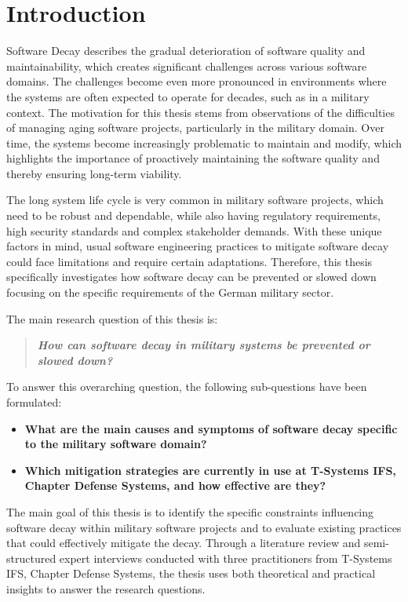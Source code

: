 \section{Introduction}
Software Decay describes the gradual deterioration of software quality and maintainability, which creates significant challenges across various software domains.
The challenges become even more pronounced in environments where the systems are often expected to operate for decades, such as in a military context.
The motivation for this thesis stems from observations of the difficulties of managing aging software projects, particularly in the military domain.
Over time, the systems become increasingly problematic to maintain and modify, which highlights the importance of proactively maintaining the software quality and thereby ensuring long-term viability.

The long system life cycle is very common in military software projects, which need to be robust and dependable, while also having regulatory requirements,
high security standards and complex stakeholder demands. With these unique factors in mind, usual software engineering practices to mitigate software decay 
could face limitations and require certain adaptations. Therefore, this thesis specifically investigates how software decay can be prevented or slowed down
focusing on the specific requirements of the German military sector.

The main research question of this thesis is:
\begin{quote}
    \textit{\textbf{How can software decay in military systems be prevented or slowed down?}}
\end{quote}
To answer this overarching question, the following sub-questions have been formulated:
\begin{itemize}
    \item \textbf{What are the main causes and symptoms of software decay specific to the military software domain?}
    \item \textbf{Which mitigation strategies are currently in use at T-Systems IFS, Chapter Defense Systems, and how effective are they?}
\end{itemize}
The main goal of this thesis is to identify the specific constraints influencing software decay within military software projects and to evaluate existing practices that could effectively mitigate the decay.
Through a literature review and semi-structured expert interviews conducted with three practitioners from T-Systems IFS, Chapter Defense Systems, the thesis uses both theoretical and practical insights to answer the research questions.

